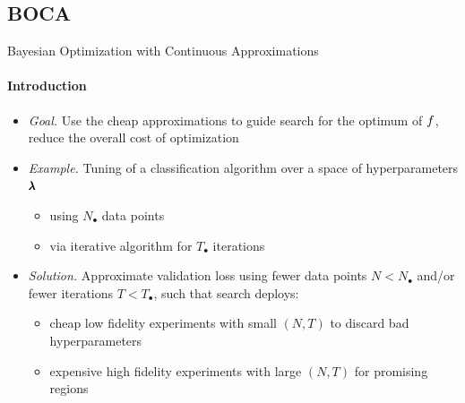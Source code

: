 \subsection{BOCA}
\begin{frame}[c]{Bayesian Optimization with Continuous Approximations}
\framesubtitle{Introduction}

\begin{itemize}
    \item \emph{Goal.} Use the cheap approximations to guide search for the optimum of $f$, \\ reduce the overall cost of optimization
    \item \emph{Example.} Tuning of a classification algorithm over a space of hyperparameters $\pmb{\lambda}$ 
        \begin{itemize}
            \item using $N_{\bullet}$ data points
            \item via iterative algorithm for $T_{\bullet}$ iterations
        \end{itemize}
    \item \emph{Solution.} Approximate validation loss using fewer data points $N < N_{\bullet}$ and/or fewer iterations $T < T_{\bullet}$, such that search deploys:
        \begin{itemize}
            \item cheap low fidelity experiments with small $(N, T)$ to discard bad hyperparameters 
            \item expensive high fidelity experiments with large $(N, T)$ for promising regions
        \end{itemize}
    
\end{itemize}
\end{frame}


